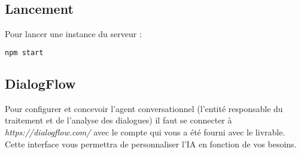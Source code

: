 \subsection{Lancement}

Pour lancer une instance du serveur :
\begin{lstlisting}[language=bash]
  npm start
\end{lstlisting}

\subsection{DialogFlow}

Pour configurer et concevoir l'agent conversationnel (l'entité responsable du traitement et de l'analyse des dialogues) il faut se connecter à \emph{https://dialogflow.com/} avec le compte
qui vous a été fourni avec le livrable. Cette interface vous permettra de personnaliser l'IA en fonction de vos besoins.
